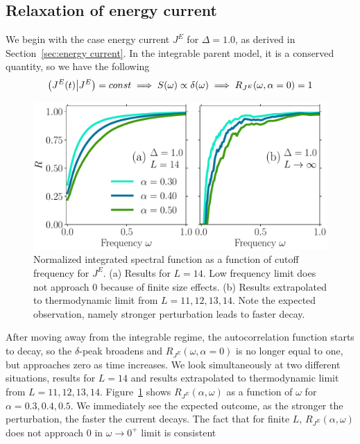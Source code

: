 \subsection{Relaxation of energy current}
We begin with the case energy current \(J^E\) for \(\Delta = 1.0\), as derived in Section~\ref{sec:energy current}.
In the integrable parent model, it is a conserved quantity, so we have the following
\begin{equation*}
  \left(J^E(t) \middle| J^E\right) = const \implies S(\omega) \propto \delta(\omega)
  \implies R_{J^E}(\omega,\alpha=0) = 1
\end{equation*}
\begin{figure}[ht]
  \centering
  \includegraphics[width=\figsize\textwidth]{Figures/current_no_scaling_small.pdf}
  \caption{Normalized integrated spectral function as a function of cutoff frequency for \(J^E\).
  (a) Results for \(L=14\). Low frequency limit does not approach 0
  because of finite size effects. (b) Results extrapolated to thermodynamic limit from \(L=11,12,13,14\).
  Note the expected observation, namely stronger perturbation leads to faster decay.}\label{fig:current decay no scaling}
\end{figure}
After moving away from the integrable regime, the autocorrelation function starts to decay,
so the \(\delta\)-peak broadens and \(R_{J^E}(\omega,\alpha=0)\) is no longer equal to one,
but approaches zero as time increases. We look simultaneously at two different situations,
results for \(L=14\) and results extrapolated to thermodynamic limit from \(L=11,12,13,14\). 
Figure~\ref{fig:current decay no scaling} shows \(R_{J^E}(\alpha,\omega)\) as a
function of \(\omega\) for \(\alpha=0.3,0.4,0.5\). We immediately see the expected outcome, as the
stronger the perturbation, the faster the current decays. The fact that for finite \(L\),
\(R_{J^E}(\alpha,\omega)\) does not approach \(0\) in \(\omega\to 0^+\) limit is consistent
